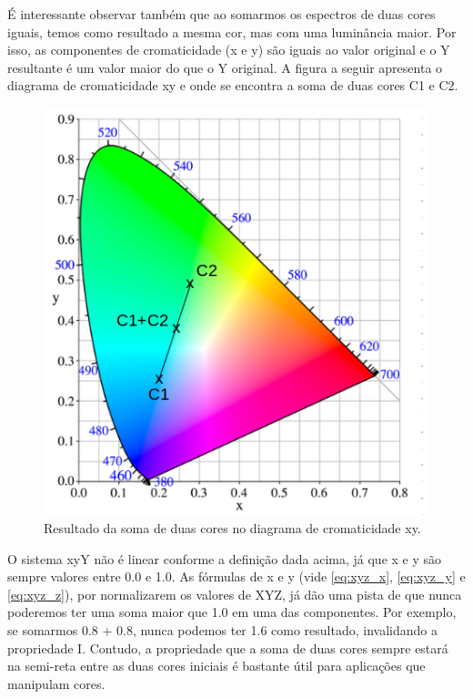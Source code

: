 \par
É interessante observar também que ao somarmos os espectros de duas cores
iguais, temos como resultado a mesma cor, mas com uma luminância maior. Por
isso, as componentes de cromaticidade (x e y) são iguais ao valor original e o Y
resultante é um valor maior do que o Y original. A figura a seguir apresenta o
diagrama de cromaticidade xy e onde se encontra a soma de duas cores C1 e C2.

\begin{figure}[!htb]
     \centering
\includegraphics[scale=0.6]{img/xy_linearity.png}
     \caption{Resultado da soma de duas cores no diagrama de cromaticidade xy.}
     \label{fig:XYZ_linearity_sample}
\end{figure}

\par
O sistema xyY não é linear conforme a definição dada acima, já que x e y são
sempre valores entre 0.0 e 1.0. As fórmulas de x e y (vide \ref{eq:xyz_x},
\ref{eq:xyz_y} e \ref{eq:xyz_z}), por normalizarem os valores de XYZ, já dão uma
pista de que nunca poderemos ter uma soma maior que 1.0 em uma das componentes.
Por exemplo, se somarmos 0.8 + 0.8, nunca podemos ter 1.6 como resultado,
invalidando a propriedade I. Contudo, a propriedade que a soma de duas cores
sempre estará na semi-reta entre as duas cores iniciais é bastante útil para
aplicações que manipulam cores.

